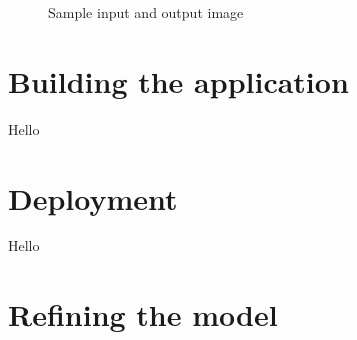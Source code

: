\begin{figure}[H]
    \centering
    \qquad
    \caption{\label{fig:sample-input-output} Sample input and output image}
\end{figure}

\section{Building the application}

Hello

\section{Deployment}

Hello

\section{Refining the model}


